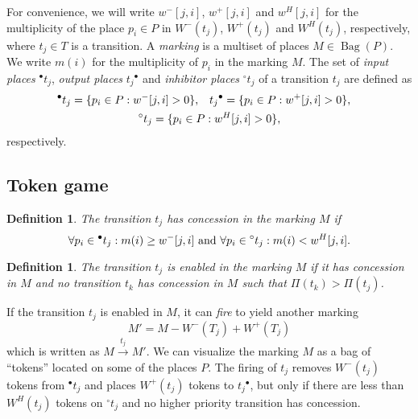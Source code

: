 \documentclass[a4paper,11pt,twoside,openright]{memoir}
\DeclareMathOperator{\Bag}{Bag}
\newcommand*{\leftTok}[1]{{}^\bullet #1}
\newcommand*{\leftInh}[1]{{}^\circ #1}
\newcommand*{\rightTok}[1]{#1{}^\bullet}
\theoremstyle{my}
\newtheorem{dfn}[thm]{Definition}
\begin{document}
For convenience, we will write $w^-[j, i]$, $w^+[j, i]$ and
$w^H[j, i]$ for the multiplicity of the place $p_i \in P$ in
$W^-(t_j)$, $W^+(t_j)$ and $W^H(t_j)$, respectively, where $t_j \in T$
is a transition. A \emph{marking} is a multiset of places
$M \in \Bag(P)$. We write $m(i)$ for the multiplicity of $p_i$ in the
marking $M$. The set of \emph{input places} $\leftTok{t_j}$,
\emph{output places} $\rightTok{t_j}$ and \emph{inhibitor places}
$\leftInh{t_j}$ of a transition $t_j$ are defined as
\begin{equation}
  \begin{gathered}
    \begin{aligned}
      \leftTok{t_j} &= \{ p_i \in P : w^-[j, i] > 0 \}\text, &
      \rightTok{t_j} &= \{ p_i \in P : w^+[j, i] > 0 \}\text,
    \end{aligned} \\
    \leftInh{t_j} = \{ p_i \in P : w^H[j, i] > 0 \}\text,
  \end{gathered}
\end{equation}
respectively.

\subsection{Token game}

\begin{dfn}
  The transition $t_j$ has \emph{concession} in the marking $M$ if
  \begin{equation}
    \forall p_i \in \leftTok{t_j} : m(i) \ge w^-[j, i] \text{ and }
    \forall p_i \in \leftInh{t_j} : m(i) < w^H[j, i] \text.
  \end{equation}
\end{dfn}

\begin{dfn}
  The transition $t_j$ is \emph{enabled} in the marking $M$ if it has
  concession in $M$ and no transition $t_{k}$ has concession in $M$
  such that $\Pi(t_{k}) > \Pi(t_j)$.
\end{dfn}

If the transition $t_j$ is enabled in $M$, it can \emph{fire} to yield
another marking
\begin{equation}
  M' = M - W^-(T_j) + W^+(T_j)
\end{equation}
which is written as $M \xrightarrow{t_j} M'$. We can visualize the
marking $M$ as a bag of ``tokens'' located on some of the places
$P$. The firing of $t_j$ removes $W^-(t_j)$ tokens from
$\leftTok{t_j}$ and places $W^{+}(t_j)$ tokens to $\rightTok{t_j}$,
but only if there are less than $W^H(t_j)$ tokens on $\leftInh{t_j}$
and no higher priority transition has concession.
\end{document}
